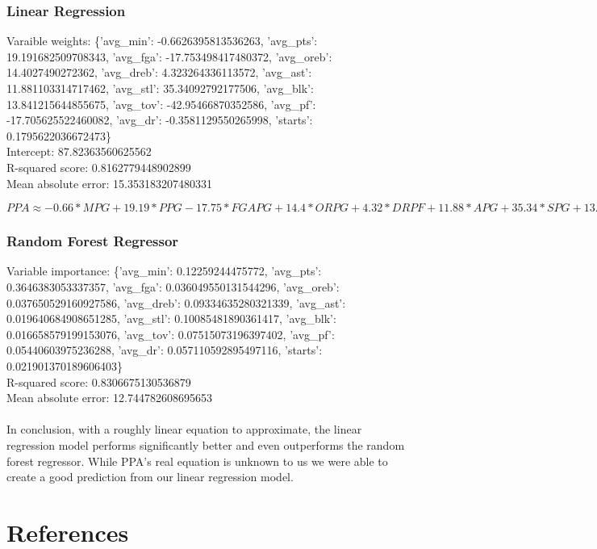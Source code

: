 \documentclass{article}
\begin{document}
\subsubsection*{Linear Regression}
Varaible weights: \{'avg_min': -0.6626395813536263, 'avg_pts': 19.191682509708343, 'avg_fga': -17.753498417480372, 'avg_oreb': 14.4027490272362, 'avg_dreb': 4.323264336113572, 'avg_ast': 11.881103314717462, 'avg_stl': 35.34092792177506, 'avg_blk': 13.841215644855675, 'avg_tov': -42.95466870352586, 'avg_pf': -17.705625522460082, 'avg_dr': -0.3581129550265998, 'starts': 0.1795622036672473\}\\
Intercept: 87.82363560625562\\
R-squared score: 0.8162779448902899\\
Mean absolute error: 15.353183207480331 \\
\begin{center}
    $PPA \approx -0.66*MPG+19.19*PPG-17.75*FGAPG+14.4*ORPG+4.32*DRPF+11.88*APG+35.34*SPG+13.84*BPG-42.95*TVPG-17.71*PFPG-0.34AVG\_DR+0.18*Starts+87.82$
\end{center}
\subsubsection*{Random Forest Regressor}
Variable importance: \{'avg_min': 0.12259244475772, 'avg_pts': 0.3646383053337357, 'avg_fga': 0.036049550131544296, 'avg_oreb': 0.037650529160927586, 'avg_dreb': 0.09334635280321339, 'avg_ast': 0.019640684908651285, 'avg_stl': 0.10085481890361417, 'avg_blk': 0.016658579199153076, 'avg_tov': 0.07515073196397402, 'avg_pf': 0.05440603975236288, 'avg_dr': 0.057110592895497116, 'starts': 0.021901370189606403\}\\
R-squared score: 0.8306675130536879\\
Mean absolute error: 12.744782608695653 \\ \\
In conclusion, with a roughly linear equation to approximate, the linear regression model performs significantly better and even outperforms the random forest regressor. While PPA's real equation is unknown to us we were able to create a good prediction from our linear regression model.

\newpage
\section*{References}

\end{document}
